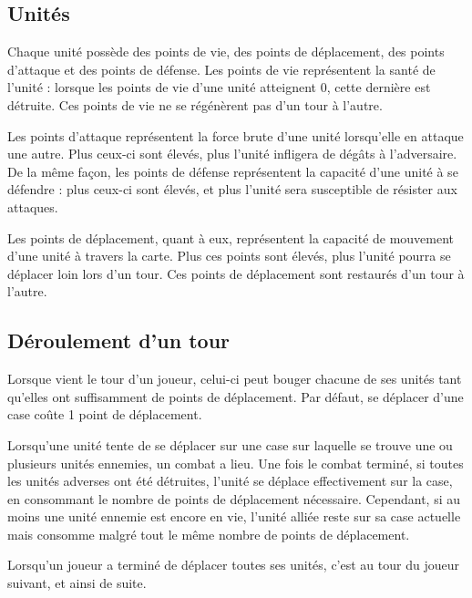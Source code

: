 	\subsection{Unités}
	Chaque unité possède des points de vie, des points de déplacement, des points d'attaque et des points de défense. Les points de vie représentent la santé de l'unité : lorsque les points de vie d'une unité atteignent 0, cette dernière est détruite. Ces points de vie ne se régénèrent pas d'un tour à l'autre.
	
	Les points d'attaque représentent la force brute d'une unité lorsqu'elle en attaque une autre.  Plus ceux-ci sont élevés, plus l'unité infligera de dégâts à l'adversaire. De la même façon, les points de défense représentent la capacité d'une unité à se défendre : plus ceux-ci sont élevés, et plus l'unité sera susceptible de résister aux attaques. 
	
	Les points de déplacement, quant à eux, représentent la capacité de mouvement d'une unité à travers la carte. Plus ces points sont élevés, plus l'unité pourra se déplacer loin lors d'un tour. Ces points de déplacement sont restaurés d'un tour à l'autre.
	
	\subsection{Déroulement d'un tour}
	Lorsque vient le tour d'un joueur, celui-ci peut bouger chacune de ses unités tant qu'elles ont suffisamment de points de déplacement. Par défaut, se déplacer d'une case coûte 1 point de déplacement.
	
	Lorsqu'une unité tente de se déplacer sur une case sur laquelle se trouve une ou plusieurs unités ennemies, un combat a lieu. Une fois le combat terminé, si toutes les unités adverses ont été détruites, l'unité se déplace effectivement sur la case, en consommant le nombre de points de déplacement nécessaire. Cependant, si au moins une unité ennemie est encore en vie, l'unité alliée reste sur sa case actuelle mais consomme malgré tout le même nombre de points de déplacement.
	
	Lorsqu'un joueur a terminé de déplacer toutes ses unités, c'est au tour du joueur suivant, et ainsi de suite.